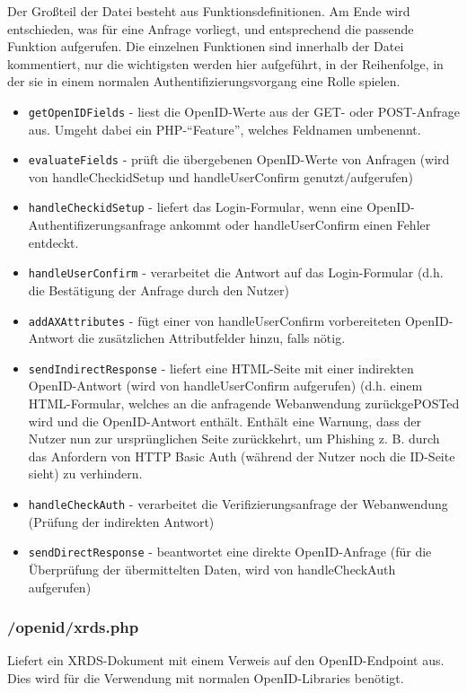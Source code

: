 \documentclass[parskip=half]{scrartcl}
\begin{document}
Der Großteil der Datei besteht aus Funktionsdefinitionen.
Am Ende wird entschieden, was für eine Anfrage vorliegt, und entsprechend die passende Funktion aufgerufen.
Die einzelnen Funktionen sind innerhalb der Datei kommentiert, nur die wichtigsten werden hier aufgeführt,
in der Reihenfolge, in der sie in einem normalen Authentifizierungsvorgang eine Rolle spielen.

\begin{itemize}
	\item \texttt{getOpenIDFields} - liest die OpenID-Werte aus der GET- oder POST-Anfrage aus. Umgeht dabei ein PHP-"`Feature"', welches Feldnamen umbenennt.
	\item \texttt{evaluateFields} - prüft die übergebenen OpenID-Werte von Anfragen (wird von handleCheckidSetup und handleUserConfirm genutzt/aufgerufen)
	\item \texttt{handleCheckidSetup} - liefert das Login-Formular, wenn eine OpenID-Authentifizerungsanfrage ankommt oder handleUserConfirm einen Fehler entdeckt.
	\item \texttt{handleUserConfirm} - verarbeitet die Antwort auf das Login-Formular (d.h. die Bestätigung der Anfrage durch den Nutzer)
	\item \texttt{addAXAttributes} - fügt einer von handleUserConfirm vorbereiteten OpenID-Antwort die zusätzlichen Attributfelder hinzu, falls nötig.
	\item \texttt{sendIndirectResponse} - liefert eine HTML-Seite mit einer indirekten OpenID-Antwort (wird von handleUserConfirm aufgerufen)
											(d.h. einem HTML-Formular, welches an die anfragende Webanwendung zurückgePOSTed wird und die OpenID-Antwort enthält.
											Enthält eine Warnung, dass der Nutzer nun zur ursprünglichen Seite zurückkehrt,
											um Phishing z. B. durch das Anfordern von HTTP Basic Auth (während der Nutzer noch die ID-Seite sieht) zu verhindern.
	\item \texttt{handleCheckAuth} - verarbeitet die Verifizierungsanfrage der Webanwendung (Prüfung der indirekten Antwort)
	\item \texttt{sendDirectResponse} - beantwortet eine direkte OpenID-Anfrage (für die Überprüfung der übermittelten Daten, wird von handleCheckAuth aufgerufen)
\end{itemize}



\subsubsection{/openid/xrds.php}
Liefert ein XRDS-Dokument mit einem Verweis auf den OpenID-Endpoint aus.
Dies wird für die Verwendung mit normalen OpenID-Libraries benötigt.
\end{document}
